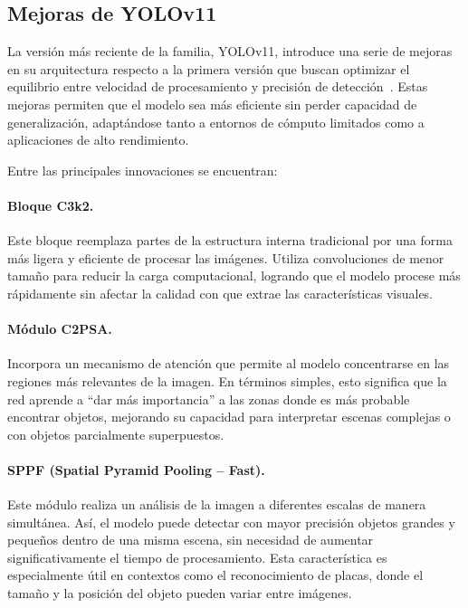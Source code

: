 \subsection*{Mejoras de YOLOv11}

La versión más reciente de la familia, YOLOv11, 
introduce una serie de mejoras en su arquitectura respecto a la primera versión que buscan optimizar el equilibrio
entre velocidad de procesamiento y precisión de detección~\cite{khanam2024yolov11overviewkeyarchitectural}. 
Estas mejoras permiten que el modelo sea más eficiente sin perder capacidad de generalización,
adaptándose tanto a entornos de cómputo limitados como a aplicaciones de alto rendimiento.

Entre las principales innovaciones se encuentran:

\paragraph{Bloque C3k2.} 
Este bloque reemplaza partes de la estructura interna tradicional por una forma más ligera 
y eficiente de procesar las imágenes. 
Utiliza convoluciones de menor tamaño para reducir la carga computacional,
logrando que el modelo procese más rápidamente sin afectar la calidad con que extrae las características visuales.

\paragraph{Módulo C2PSA.} 
Incorpora un mecanismo de atención que permite al modelo concentrarse en las regiones más relevantes de la imagen. 
En términos simples, esto significa que la red aprende a ``dar más importancia''
a las zonas donde es más probable encontrar objetos, 
mejorando su capacidad para interpretar escenas complejas o con objetos parcialmente superpuestos.

\paragraph{SPPF (Spatial Pyramid Pooling – Fast).} 
Este módulo realiza un análisis de la imagen a diferentes escalas de manera simultánea. 
Así, el modelo puede detectar con mayor precisión objetos grandes y pequeños dentro de una misma escena, 
sin necesidad de aumentar significativamente el tiempo de procesamiento. 
Esta característica es especialmente útil en contextos como el reconocimiento de placas, 
donde el tamaño y la posición del objeto pueden variar entre imágenes.

